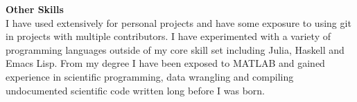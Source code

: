 \textbf{Other Skills}\\
I have used  extensively for personal projects and have some exposure
to using git in projects with multiple contributors. I have experimented with a
variety of programming languages outside of my core skill set including Julia,
Haskell and Emacs Lisp. From my degree I have been exposed to MATLAB and gained
experience in scientific  programming, data wrangling and
compiling undocumented scientific code written long before I was born.

